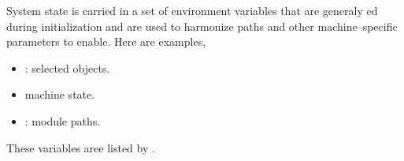 System state is carried in a set of environment variables that are generaly ed during initialization and are used to harmonize paths and other machine--specific parameters to enable. Here are examples, 
%
\begin{itemize}
    \item{: selected objects.}
    \item{ machine state.}
    \item{: module paths.}
\end{itemize}
%
These variables aree listed by .